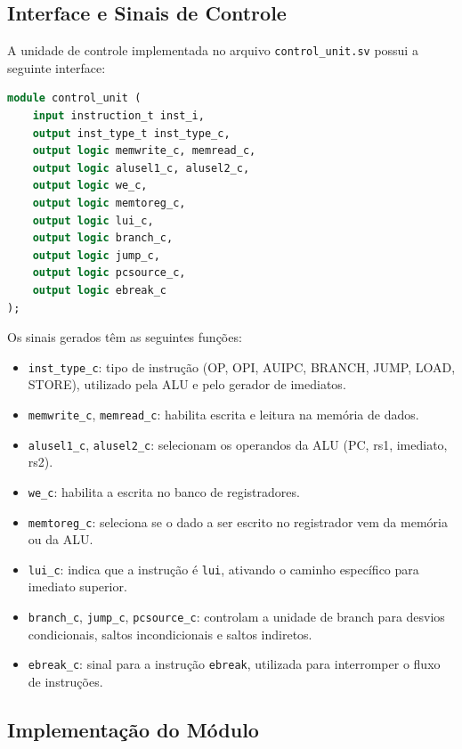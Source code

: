 \documentclass[
	12pt,				%
	oneside,
	a4paper,			%
	english,			%
	french,				%
	spanish,			%
	brazil,				%
	]{abntex2}
\begin{document}
\subsection{Interface e Sinais de Controle}

A unidade de controle implementada no arquivo \texttt{control\_unit.sv} possui a seguinte interface:

\begin{lstlisting}[language=SystemVerilog, caption={Interface da Unidade de Controle}, label={lst:cu_interface}]
module control_unit (
    input instruction_t inst_i,
    output inst_type_t inst_type_c,
    output logic memwrite_c, memread_c,
    output logic alusel1_c, alusel2_c,
    output logic we_c,
    output logic memtoreg_c,
    output logic lui_c,
    output logic branch_c,
    output logic jump_c,
    output logic pcsource_c,
    output logic ebreak_c
);
\end{lstlisting}

Os sinais gerados têm as seguintes funções:

\begin{itemize}
  \item \texttt{inst\_type\_c}: tipo de instrução (OP, OPI, AUIPC, BRANCH, JUMP, LOAD, STORE), utilizado pela ALU e pelo gerador de imediatos.
  \item \texttt{memwrite\_c}, \texttt{memread\_c}: habilita escrita e leitura na memória de dados.
  \item \texttt{alusel1\_c}, \texttt{alusel2\_c}: selecionam os operandos da ALU (PC, rs1, imediato, rs2).
  \item \texttt{we\_c}: habilita a escrita no banco de registradores.
  \item \texttt{memtoreg\_c}: seleciona se o dado a ser escrito no registrador vem da memória ou da ALU.
  \item \texttt{lui\_c}: indica que a instrução é \texttt{lui}, ativando o caminho específico para imediato superior.
  \item \texttt{branch\_c}, \texttt{jump\_c}, \texttt{pcsource\_c}: controlam a unidade de branch para desvios condicionais, saltos incondicionais e saltos indiretos.
  \item \texttt{ebreak\_c}: sinal para a instrução \texttt{ebreak}, utilizada para interromper o fluxo de instruções.
\end{itemize}

\subsection{Implementação do Módulo}
\end{document}
